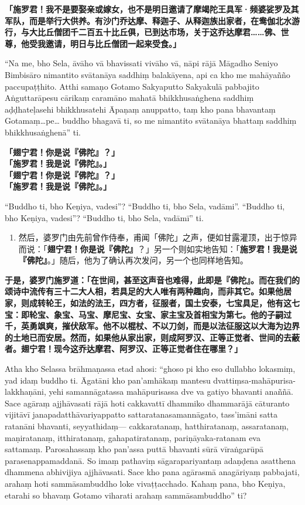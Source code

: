 \textbf{「施罗君！我不是要娶亲或嫁女，也不是明日邀请了摩竭陀王具军·频婆娑罗及其军队，而是举行大供养。有沙门乔达摩、释迦子、从释迦族出家者，在鸯伽北水游行，与大比丘僧团千二百五十比丘俱，已到达市场，关于这乔达摩君……佛、世尊，他受我邀请，明日与比丘僧团一起来受食。」}

“Na me, bho Sela, āvāho vā bhavissati vivāho vā, nāpi rājā Māgadho Seniyo Bimbisāro nimantito svātanāya saddhiṃ balakāyena, api ca kho me mahāyañño paccupaṭṭhito. Atthi samaṇo Gotamo Sakyaputto Sakyakulā pabbajito Aṅguttarāpesu cārikaṃ caramāno mahatā bhikkhusaṅghena saddhiṃ aḍḍhateḷasehi bhikkhusatehi Āpaṇaṃ anuppatto, taṃ kho pana bhavantaṃ Gotamaṃ…pe… buddho bhagavā ti, so me nimantito svātanāya bhattaṃ saddhiṃ bhikkhusaṅghenā” ti.

\textbf{「翅宁君！你是说『佛陀』？」\\}
\textbf{「施罗君！我是说『佛陀』。」\\}
\textbf{「翅宁君！你是说『佛陀』？」\\}
\textbf{「施罗君！我是说『佛陀』。」}

“Buddho ti, bho Keṇiya, vadesi”? “Buddho ti, bho Sela, vadāmi”. “Buddho ti, bho Keṇiya, vadesi”? “Buddho ti, bho Sela, vadāmī” ti.

\begin{enumerate}\item 然后，婆罗门由先前曾作侍奉，甫闻「佛陀」之声，便如甘露灌顶，出于惊异而说：「\textbf{翅宁君！你是说『佛陀』}？」另一个则如实地告知：「\textbf{施罗君！我是说『佛陀』}。」随后，他为了确认再次发问，另一个也同样地告知。\end{enumerate}

\textbf{于是，婆罗门施罗道：「在世间，甚至这声音也难得，此即是『佛陀』。而在我们的颂诗中流传有三十二大人相，若具足的大人唯有两种趣向，而非其它。如果他居家，则成转轮王，如法的法王，四方者，征服者，国土安泰，七宝具足，他有这七宝：即轮宝、象宝、马宝、摩尼宝、女宝、家主宝及首相宝为第七。他的子嗣过千，英勇飒爽，摧伏敌军。他不以棍杖、不以刀剑，而是以法征服这以大海为边界的土地已而安居。然而，如果他从家出家，则成阿罗汉、正等正觉者、世间的去蔽者。翅宁君！现今这乔达摩君、阿罗汉、正等正觉者住在哪里？」}

Atha kho Selassa brāhmaṇassa etad ahosi: “ghoso pi kho eso dullabho lokasmiṃ, yad idaṃ buddho ti. Āgatāni kho pan’amhākaṃ mantesu dvattiṃsa-mahāpurisa-lakkhaṇāni, yehi samannāgatassa mahāpurisassa dve va gatiyo bhavanti anaññā. Sace agāraṃ ajjhāvasati rājā hoti cakkavattī dhammiko dhammarājā cāturanto vijitāvī janapadatthāvariyappatto sattaratanasamannāgato, tass’imāni satta ratanāni bhavanti, seyyathidaṃ— cakkaratanaṃ, hatthiratanaṃ, assaratanaṃ, maṇiratanaṃ, itthiratanaṃ, gahapatiratanaṃ, pariṇāyaka-ratanam eva sattamaṃ. Parosahassaṃ kho pan’assa puttā bhavanti sūrā vīraṅgarūpā parasenappamaddanā. So imaṃ pathaviṃ sāgarapariyantaṃ adaṇḍena asatthena dhammena abhivijiya ajjhāvasati. Sace kho pana agārasmā anagāriyaṃ pabbajati, arahaṃ hoti sammāsambuddho loke vivaṭṭacchado. Kahaṃ pana, bho Keṇiya, etarahi so bhavaṃ Gotamo viharati arahaṃ sammāsambuddho” ti?

